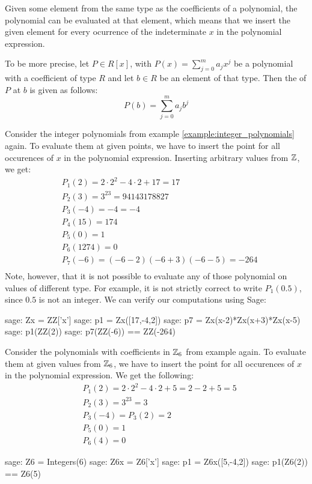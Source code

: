 Given some element from the same type as the coefficients of a polynomial, the polynomial can be evaluated at that element, which means that we insert the given element for every ocurrence of the indeterminate $x$ in the polynomial expression.

To be more precise, let $P\in R[x]$, with $P(x)=\sum_{j=0}^m a_j x^j$ be a polynomial with a coefficient of type $R$ and let $b\in R$ be an element of that type. Then the  of $P$ at $b$ is given as follows:
\begin{equation}
P(b) = \sum_{j=0}^m a_j b^j
\end{equation}
\begin{example}Consider the integer polynomials from example \ref{example:integer_polynomials} again. To evaluate them at given points, we have to insert the point for all occurences of $x$ in the polynomial expression. Inserting arbitrary values from $\mathbb{Z}$, we get:
\begin{align*}
 &P_1(2)    = 2\cdot 2^2 -4\cdot 2 +17 = 17 \\
 &P_2(3)    = 3^{23}=94143178827 \\
 &P_3(-4)   = -4 = -4 \\
 &P_4(15)   = 174 \\
 &P_5(0)    = 1 \\
 &P_6(1274) =0 \\
 &P_7(-6)   = (-6-2)(-6+3)(-6-5) = -264 \\
\end{align*}
Note, however, that it is not possible to evaluate any of those polynomial on values of different type. For example, it is not strictly correct to write $P_1(0.5)$, since $0.5$ is not an integer. We can verify our computations using Sage:
\begin{sagecommandline}
sage: Zx = ZZ['x']
sage: p1 = Zx([17,-4,2])
sage: p7 = Zx(x-2)*Zx(x+3)*Zx(x-5)
sage: p1(ZZ(2))
sage: p7(ZZ(-6)) == ZZ(-264)
\end{sagecommandline}

\end{example}
\begin{example} Consider the polynomials with coefficients in $\mathbb{Z}_6$ from example \label{example:integer_mod_6_polynomials} again. To evaluate them at given values from $\mathbb{Z}_6$, we have to insert the point for all occurences of $x$ in the polynomial expression. We get the following:
\begin{align*}
 & P_1(2)= 2\cdot 2^2 -4\cdot 2 +5 = 2 - 2 + 5 = 5\\
 &P_2(3)= 3^{23}=3\\
 &P_3(-4)= P_3(2) = 2\\
 &P_5(0)= 1\\
 &P_6(4)=0
\end{align*}
\begin{sagecommandline}
sage: Z6 = Integers(6)
sage: Z6x = Z6['x']
sage: p1 = Z6x([5,-4,2])
sage: p1(Z6(2)) == Z6(5)
\end{sagecommandline}

\end{example}
